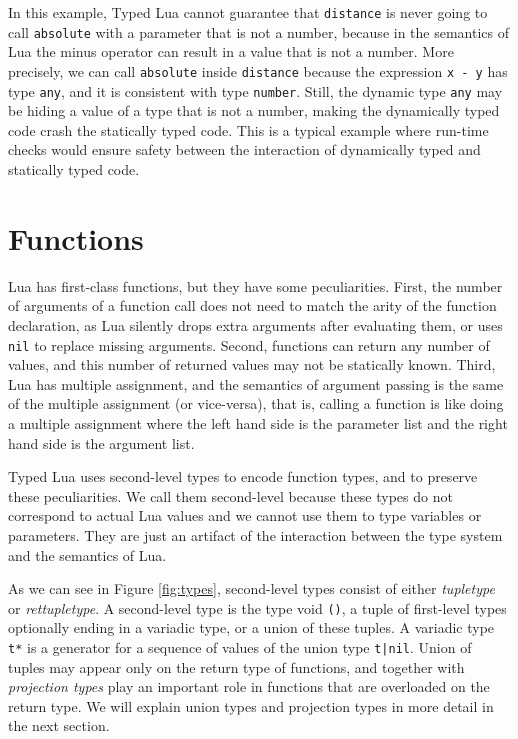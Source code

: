 In this example, Typed Lua cannot guarantee that \texttt{distance} is never
going to call \texttt{absolute} with a parameter that is not a number,
because in the semantics of Lua the minus operator can result in a
value that is not a number.
More precisely, we can call \texttt{absolute} inside \texttt{distance}
because the expression \texttt{x - y} has type \texttt{any},
and it is consistent with type \texttt{number}.
Still, the dynamic type \texttt{any} may be hiding a value of a type
that is not a number, making the dynamically typed code crash the
statically typed code.
This is a typical example where run-time checks would ensure safety
between the interaction of dynamically typed and statically typed code.

\section{Functions}

Lua has first-class functions, but they have some peculiarities.
First, the number of arguments of a function call does
not need to match the arity of the function declaration, as Lua silently
drops extra arguments after evaluating them, or uses \texttt{nil} to
replace missing arguments.
Second, functions can return any number of values,
and this number of returned values may not be statically known.
Third, Lua has multiple assignment, and the semantics
of argument passing is the same of the multiple assignment
(or vice-versa), that is, calling a function is like doing a
multiple assignment where the left hand side is the parameter list
and the right hand side is the argument list.

Typed Lua uses second-level types to encode function types,
and to preserve these peculiarities.
We call them second-level because these types do not correspond
to actual Lua values and we cannot use them to type variables or
parameters.
They are just an artifact of the interaction between the type system
and the semantics of Lua.

As we can see in Figure \ref{fig:types}, second-level types consist
of either \emph{tupletype} or \emph{rettupletype}.
A second-level type is the type void \texttt{()},
a tuple of first-level types optionally ending in a variadic type,
or a union of these tuples.
A variadic type \texttt{t*} is a generator for a sequence of values
of the union type \texttt{t|nil}.
Union of tuples may appear only on the return type of functions,
and together with \emph{projection types} play an important role
in functions that are overloaded on the return type.
We will explain union types and projection types in more detail
in the next section.

